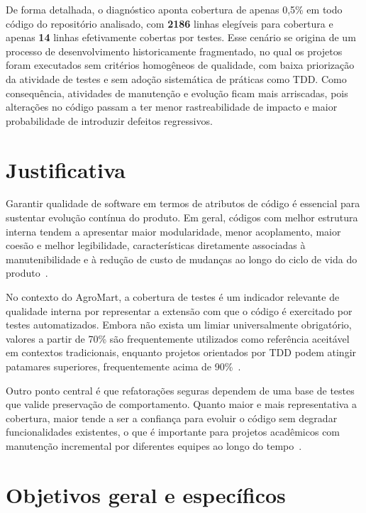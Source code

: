 De forma detalhada, o diagnóstico aponta cobertura de apenas 0,5\% em todo código do repositório analisado,
com \textbf{2186} linhas elegíveis para cobertura e apenas \textbf{14} linhas efetivamente cobertas por testes.
Esse cenário se origina de um processo de desenvolvimento historicamente fragmentado, no qual os projetos foram executados sem critérios homogêneos de qualidade,
com baixa priorização da atividade de testes e sem adoção sistemática de práticas como TDD. Como consequência, atividades de manutenção e evolução ficam mais arriscadas,
pois alterações no código passam a ter menor rastreabilidade de impacto e maior probabilidade de introduzir defeitos regressivos.

\section{Justificativa}

Garantir qualidade de software em termos de atributos de código é essencial para sustentar evolução contínua do produto.
Em geral, códigos com melhor estrutura interna tendem a apresentar maior modularidade, menor acoplamento, maior coesão e melhor legibilidade,
características diretamente associadas à manutenibilidade e à redução de custo de mudanças ao longo do ciclo de vida do produto~\cite{iso25010,mcconnell2004code,valente2020engenharia}.

No contexto do AgroMart, a cobertura de testes é um indicador relevante de qualidade interna por representar a extensão com que o código é exercitado por testes automatizados.
Embora não exista um limiar universalmente obrigatório, valores a partir de 70\% são frequentemente utilizados como referência aceitável em contextos tradicionais,
enquanto projetos orientados por TDD podem atingir patamares superiores, frequentemente acima de 90\%~\cite{valente2020engenharia}.

Outro ponto central é que refatorações seguras dependem de uma base de testes que valide preservação de comportamento.
Quanto maior e mais representativa a cobertura, maior tende a ser a confiança para evoluir o código sem degradar funcionalidades existentes,
o que é importante para projetos acadêmicos com manutenção incremental por diferentes equipes ao longo do tempo~\cite{fowler2012test,valente2020engenharia}.

\section{Objetivos geral e específicos}


